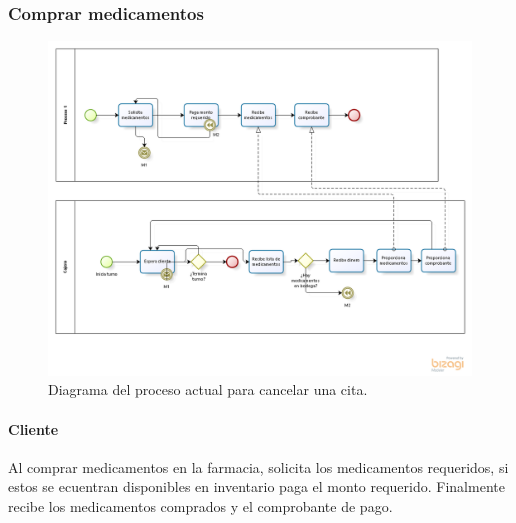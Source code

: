 \subsubsection{Comprar medicamentos}
	\begin{figure}[htbp!]
		\centering
		\includegraphics[width=\textwidth]{images/procesos/medicamentos_old}
		\caption{Diagrama del proceso actual para cancelar una cita.}
	\end{figure}
	\paragraph{Cliente}
	Al comprar medicamentos en la farmacia, solicita los medicamentos requeridos, si estos se ecuentran disponibles en inventario paga el monto requerido. Finalmente recibe los medicamentos comprados y el comprobante de pago.
